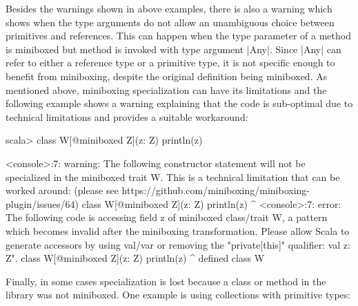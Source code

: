 Besides the warnings shown in above examples, there is also a warning which shows when the type arguments do not allow an unambiguous choice between primitives and references. This can happen when the type parameter of a method is miniboxed but method is invoked with type argument |Any|. Since |Any| can refer to either a reference type or a primitive type, it is not specific enough to benefit from miniboxing, despite the original definition being miniboxed.  As mentioned above, miniboxing specialization can have its limitations and the following example shows a warning explaining that the code is sub-optimal due to technical limitations and provides a suitable workaround:

\begin{lstlisting-nobreak}
scala> class W[@miniboxed Z](z: Z) { println(z) }

<console>:7: warning: The following constructor statement will not be
specialized in the miniboxed trait W. This is a technical limitation
that can be worked around: (please see
https://github.com/miniboxing/miniboxing-plugin/issues/64)
       class W[@miniboxed Z](z: Z) { println(z) }
                                            ^
<console>:7: error: The following code is accessing field z of miniboxed
class/trait W, a pattern which becomes invalid after the miniboxing
transformation. Please allow Scala to generate accessors by using val/var
or removing the "private[this]" qualifier: val z: Z".
       class W[@miniboxed Z](z: Z) { println(z) }
                                             ^
defined class W
\end{lstlisting-nobreak}
Finally, in some cases specialization is lost because a class or method in the library was not miniboxed. One example is using collections with primitive types:

